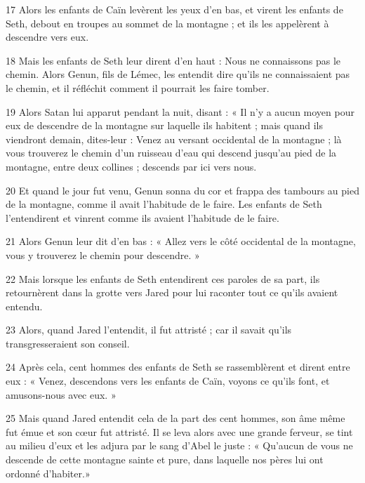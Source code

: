 \par 17 Alors les enfants de Caïn levèrent les yeux d'en bas, et virent les enfants de Seth, debout en troupes au sommet de la montagne ; et ils les appelèrent à descendre vers eux.

\par 18 Mais les enfants de Seth leur dirent d'en haut : Nous ne connaissons pas le chemin. Alors Genun, fils de Lémec, les entendit dire qu'ils ne connaissaient pas le chemin, et il réfléchit comment il pourrait les faire tomber.

\par 19 Alors Satan lui apparut pendant la nuit, disant : « Il n'y a aucun moyen pour eux de descendre de la montagne sur laquelle ils habitent ; mais quand ils viendront demain, dites-leur : Venez au versant occidental de la montagne ; là vous trouverez le chemin d'un ruisseau d'eau qui descend jusqu'au pied de la montagne, entre deux collines ; descends par ici vers nous.

\par 20 Et quand le jour fut venu, Genun sonna du cor et frappa des tambours au pied de la montagne, comme il avait l'habitude de le faire. Les enfants de Seth l'entendirent et vinrent comme ils avaient l'habitude de le faire.

\par 21 Alors Genun leur dit d'en bas : « Allez vers le côté occidental de la montagne, vous y trouverez le chemin pour descendre. »

\par 22 Mais lorsque les enfants de Seth entendirent ces paroles de sa part, ils retournèrent dans la grotte vers Jared pour lui raconter tout ce qu'ils avaient entendu.

\par 23 Alors, quand Jared l'entendit, il fut attristé ; car il savait qu'ils transgresseraient son conseil.

\par 24 Après cela, cent hommes des enfants de Seth se rassemblèrent et dirent entre eux : « Venez, descendons vers les enfants de Caïn, voyons ce qu'ils font, et amusons-nous avec eux. »

\par 25 Mais quand Jared entendit cela de la part des cent hommes, son âme même fut émue et son cœur fut attristé. Il se leva alors avec une grande ferveur, se tint au milieu d'eux et les adjura par le sang d'Abel le juste : « Qu'aucun de vous ne descende de cette montagne sainte et pure, dans laquelle nos pères lui ont ordonné d'habiter.»

